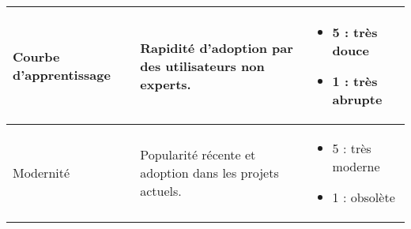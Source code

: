 \begin{longtable}{|p{}|p{}|p{}|}
Courbe d’apprentissage & Rapidité d’adoption par des utilisateurs non experts. & 
\begin{itemize}
  \item 5 : très douce
  \item 1 : très abrupte
\end{itemize} \\
\hline

Modernité & Popularité récente et adoption dans les projets actuels. & 
\begin{itemize}
  \item 5 : très moderne
  \item 1 : obsolète
\end{itemize} \\
\hline

\end{longtable}
